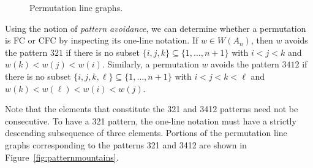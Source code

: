 \begin{example}
\begin{center}
\begin{figure}[ht!]
\begin{subfigure}{0.4\textwidth}
\caption{}
\label{fig:permlinegraphs2}
\end{subfigure}
\caption{Permutation line graphs.}\label{fig:permlinegraphsexample}
\end{figure}
\end{center}
\end{example}

    Using the notion of \emph{pattern avoidance}, we can determine whether a permutation is FC or CFC by inspecting its one-line notation.
    If $w \in W(A_n)$, then $w$ avoids the pattern $321$ if there is no subset $\{i,j,k\} \subseteq \{1,\ldots,n+1\}$ with $i < j < k$ and $w(k) < w(j) < w(i)$.
    Similarly, a permutation $w$ avoids the pattern $3412$ if there is no subset $\{i,j,k,\ell\} \subseteq \{1,\ldots,n+1\}$ with $i < j < k < \ell$ and $w(k) < w(\ell) < w(i) < w(j)$.
    
    Note that the elements that constitute the 321 and 3412 patterns need not be consecutive. To have a 321 pattern, the one-line notation must have a strictly descending subsequence of three elements.
    Portions of the permutation line graphs corresponding to the patterns 321 and 3412 are shown in Figure~\ref{fig:patternmountains}.

